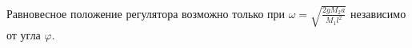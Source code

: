 Равновесное положение регулятора возможно только при
$\omega = \sqrt{\frac{2gM_2a}{M_1l^2}}$
независимо от угла $\varphi$.
